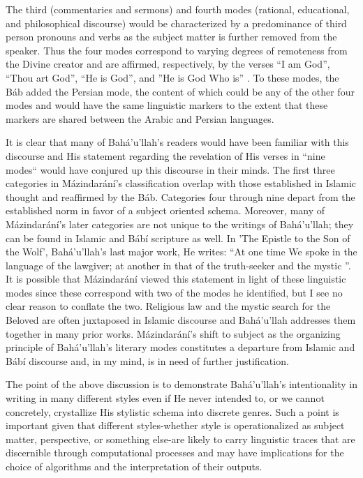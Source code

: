 \documentclass[12pt, oneside]{report}
\begin{document}
The third (commentaries and sermons) and fourth modes (rational, educational, and philosophical discourse) would be characterized by a predominance of third person pronouns and verbs as the subject matter is further removed from the speaker.
Thus the four modes correspond to varying degrees of remoteness from the Divine creator and are affirmed, respectively, by the verses ``I am God'', ``Thou art God'', ``He is God'', and ''He is God Who is'' \cite{saiedi_gate_2008}.
To these modes, the B\'{a}b added the Persian mode, the content of which could be any of the other four modes \cite{saiedi_gate_2008} and would have the same linguistic markers to the extent that these markers are shared between the Arabic and Persian languages.
\par
It is clear that many of Bah\'{a}'u'llah's readers would have been familiar with this discourse and His statement regarding the revelation of His verses in ``nine modes`` would have conjured up this discourse in their minds.
The first three categories in M\'{a}zindar\'{a}n\'{i}'s classification overlap with those established in Islamic thought and reaffirmed by the B\'{a}b.
Categories four through nine depart from the established norm in favor of a subject oriented schema.
Moreover, many of M\'{a}zindar\'{a}n\'{i}'s later categories are not unique to the writings of Bah\'{a}'u'llah; they can be found in Islamic and B\'{a}b\'{i} scripture as well.
In 'The Epistle to the Son of the Wolf', Bah\'{a}'u'llah's last major work, He writes: “At one time We spoke in the language of the lawgiver; at another in that of the truth-seeker and the mystic \cite{}”.
It is possible that M\'{a}zindar\'{a}n\'{i} viewed this statement in light of these linguistic modes since these correspond with two of the modes he identified, but I see no clear reason to conflate the two.
Religious law and the mystic search for the Beloved are often juxtaposed in Islamic discourse and Bah\'{a}'u'llah addresses them together in many prior works.
M\'{a}zindar\'{a}n\'{i}'s shift to subject as the organizing principle of Bah\'{a}'u'llah's literary modes constitutes a departure from Islamic and B\'{a}b\'{i} discourse and, in my mind, is in need of further justification.
\par
The point of the above discussion is to demonstrate Bah\'{a}'u'llah's intentionality in writing in many different styles even if He never intended to, or we cannot concretely, crystallize His stylistic schema into discrete genres.
Such a point is important given that different styles-whether style is operationalized as subject matter, perspective, or something else-are likely to carry linguistic traces that are discernible through computational processes and may have implications for the choice of algorithms and the interpretation of their outputs.
\end{document}
